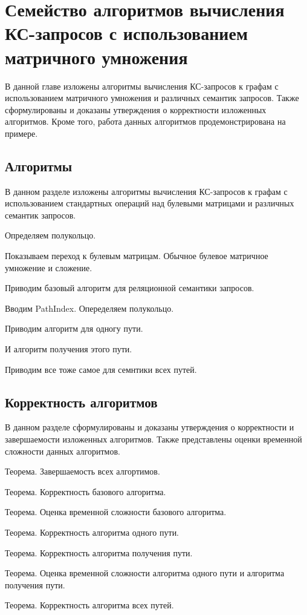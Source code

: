 \chapter{Семейство алгоритмов вычисления КС-запросов с использованием матричного умножения}\label{ch:ch3}
В данной главе изложены алгоритмы вычисления КС-запросов к графам с использованием матричного умножения и различных семантик запросов. Также сформулированы и доказаны утверждения о корректности изложенных алгоритмов. Кроме того, работа данных алгоритмов продемонстрирована на примере. 
\section{Алгоритмы}\label{sec:ch3/sect1}
В данном разделе изложены алгоритмы вычисления КС-запросов к графам с использованием стандартных операций над булевыми матрицами и различных семантик запросов.

Определяем полукольцо.

Показываем переход к булевым матрицам. Обычное булевое матричное умножение и сложение.

Приводим базовый алгоритм для реляционной семантики запросов.

Вводим PathIndex. Опеределяем полукольцо.

Приводим алгоритм для одногу пути.

И алгоритм получения этого пути.

Приводим все тоже самое для семнтики всех путей.

\section{Корректность алгоритмов}\label{sec:ch3/sect2}
В данном разделе сформулированы и доказаны утверждения о корректности и завершаемости изложенных алгоритмов. Также представлены оценки временной сложности данных алгоритмов.

Теорема. Завершаемость всех алгортимов.

Теорема. Корректность базового алгоритма.

Теорема. Оценка временной сложности базового алгоритма.

Теорема. Корректность алгоритма одного пути.

Теорема. Корректность алгоритма получения пути.

Теорема. Оценка временной сложности алгоритма одного пути и алгоритма получения пути.

Теорема. Корректность алгоритма всех путей.

